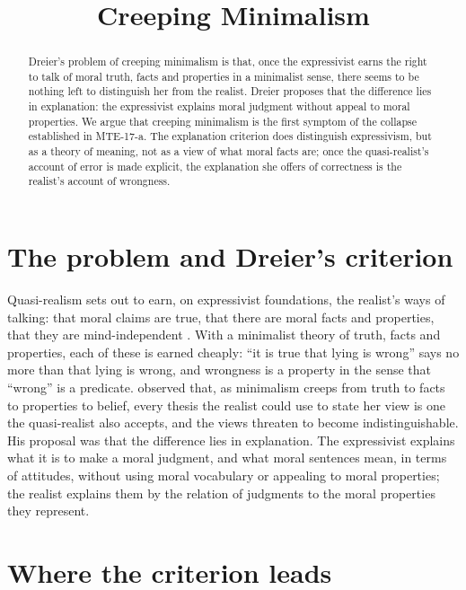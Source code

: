 \documentclass{situationist-preprint}
\title{Creeping Minimalism}
\begin{document}
\maketitle

\begin{abstract}
Dreier's problem of creeping minimalism is that, once the expressivist earns the right to talk of moral truth, facts and properties in a minimalist sense, there seems to be nothing left to distinguish her from the realist. Dreier proposes that the difference lies in explanation: the expressivist explains moral judgment without appeal to moral properties. We argue that creeping minimalism is the first symptom of the collapse established in MTE-17-a. The explanation criterion does distinguish expressivism, but as a theory of meaning, not as a view of what moral facts are; once the quasi-realist's account of error is made explicit, the explanation she offers of correctness is the realist's account of wrongness.
\end{abstract}

\section{The problem and Dreier's criterion}

Quasi-realism sets out to earn, on expressivist foundations, the realist's ways of talking: that moral claims are true, that there are moral facts and properties, that they are mind-independent \citep{Blackburn1993}. With a minimalist theory of truth, facts and properties, each of these is earned cheaply: \enquote{it is true that lying is wrong} says no more than that lying is wrong, and wrongness is a property in the sense that \enquote{wrong} is a predicate. \citet{Dreier2004} observed that, as minimalism creeps from truth to facts to properties to belief, every thesis the realist could use to state her view is one the quasi-realist also accepts, and the views threaten to become indistinguishable. His proposal was that the difference lies in explanation. The expressivist explains what it is to make a moral judgment, and what moral sentences mean, in terms of attitudes, without using moral vocabulary or appealing to moral properties; the realist explains them by the relation of judgments to the moral properties they represent.

\section{Where the criterion leads}
\end{document}
